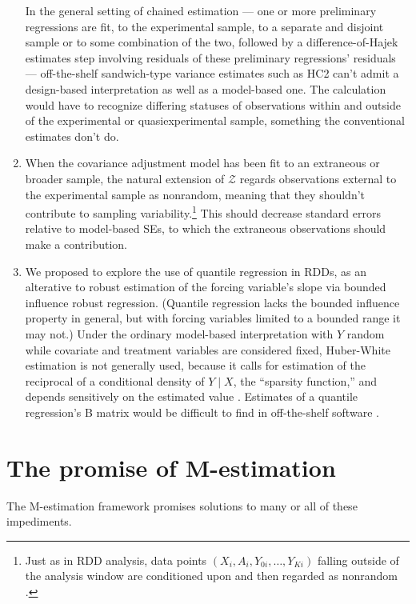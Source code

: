 \begin{enumerate}
  In the general setting of chained estimation ---  one or more
  preliminary regressions are fit, to the experimental sample, to a
  separate and disjoint sample or to some combination of the two,
  followed by a difference-of-Hajek estimates step involving residuals
  of these preliminary regressions' residuals --- off-the-shelf 
  sandwich-type variance estimates such as HC2 can't admit a design-based interpretation as well as
  a  model-based one. The calculation would have to recognize differing statuses of observations within and outside of the experimental or quasiexperimental sample, something the conventional estimates don't do. 
\item \label{it:prob-nonexperimentals-as-nonrandom}
  When the covariance adjustment model has been fit to an extraneous or
  broader sample, the natural extension of \(\mathcal{Z}\) regards
  observations external to the experimental sample as nonrandom, meaning
  that they shouldn't contribute to sampling variability.\footnote{Just as in
  RDD analysis, data points $(X_{i}, A_{i}, Y_{0i}, \ldots, Y_{Ki})$
  falling outside of the analysis window are
  conditioned upon and then regarded as nonrandom \citep[][display A1 on p.22]{salesHansen2019lrd}.} This should decrease standard
  errors relative to model-based SEs, to which the extraneous observations should make a 
  contribution.
\item \label{it:quantile-regr-SEs}  We proposed to explore the use of
  quantile regression in RDDs, as an alterative to robust estimation
  of the forcing variable's slope via bounded influence robust
  regression. (Quantile regression lacks the bounded influence
  property in general, but with forcing variables limited to a bounded
  range it may not.) Under the ordinary model-based interpretation
  with $Y$ random while covariate and treatment variables are
  considered fixed, Huber-White estimation is not generally used,
  because it calls for estimation of the reciprocal of a conditional density of $Y
  \mid X$, the ``sparsity function,'' and depends sensitively on the estimated
  value \citep[][\S3.4]{koenker2005quantileregr}. Estimates of a quantile regression's B matrix would be
  difficult to find in off-the-shelf software \citep[][\S2.5]{he18resampling}.
\end{enumerate}

\section*{The promise of M-estimation}
The M-estimation framework promises solutions to many or all of
these impediments.  
